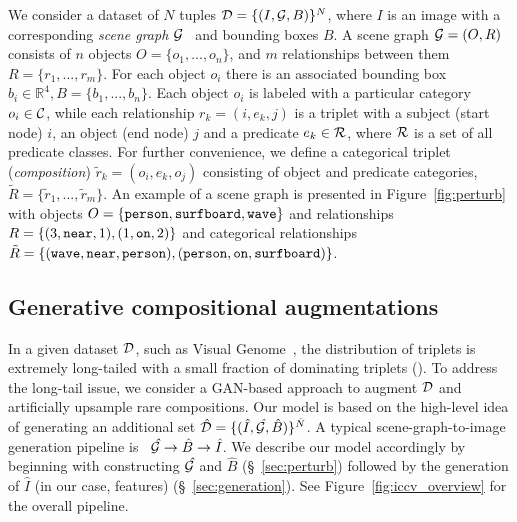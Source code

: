 We consider a dataset of $N$ tuples ${\cal D}=\{(I,\mathit{\cal G},B)\}^N$, where $I$ is an image with a corresponding \textit{scene graph} $\mathit{\cal G}$~\citep{johnson2015image} and bounding boxes $B$.
A scene graph $\mathit{\cal G}=(O, R)$ consists of $n$ objects $O= \{o_1, ... , o_n\}$, and $m$ relationships between them $R=\{r_1, ..., r_m\}$. 
For each object $o_i$ there is an associated bounding box
$b_i \in \mathbb{R}^{4}, B = \{b_1, ... , b_n\}$.
Each object $o_i$ is labeled with a particular category $o_i \in \cal{C}$, while each relationship $r_k=(i, e_k, j)$ is a triplet with a subject (start node) $i$, an object (end node) $j$ and a predicate $e_k \in {\cal R}$, where $\cal R$ is a set of all predicate classes. 
For further convenience, we define a categorical triplet (\textit{composition})  $\tilde{r}_k=(o_i, e_k, o_j)$ consisting of object and predicate categories, $\tilde{R}=\{\tilde{r}_1, ..., \tilde{r}_m\}$.
An example of a scene graph is presented in Figure~\ref{fig:perturb} with objects $O=\{\text{\texttt{person}}, \text{\texttt{surfboard}}, \text{\texttt{wave}} \}$ and relationships $R=\{ (3,\text{\texttt{near}}, 1), (1,\text{\texttt{on}},2) \}$ and categorical relationships $\tilde{R}=\{ (\text{\texttt{wave}},\text{\texttt{near}},\text{\texttt{person}}), (\text{\texttt{person}},\text{\texttt{on}},\text{\texttt{surfboard}}) \}$.

\vspace{-5pt}
\subsection{Generative compositional augmentations\label{sec:model}}
\vspace{-5pt}

In a given dataset $\cal D$, such as Visual Genome~\citep{krishna2017visual}, the distribution of triplets is extremely long-tailed with a small fraction of dominating triplets (\fig{\ref{fig:iccv_motivation}}). To address the long-tail issue, we consider a GAN-based approach to augment $\cal D$ and artificially upsample rare compositions.
Our model is based on the high-level idea of generating an additional set $\hat{\cal D} = \{ (\hat{I},\mathit{\hat{\mathit{\cal G}}}, \hat{B}) \}^{\hat{N}}$. A typical scene-graph-to-image generation pipeline is~\citep{johnson2018image} $\mathit{\hat{\mathit{\cal G}}} \rightarrow \hat{B} \rightarrow \hat{I} $. We describe our model accordingly by beginning with constructing $\mathit{\hat{\mathit{\cal G}}}$ and $\hat{B}$ (\S~\ref{sec:perturb}) followed by the generation of $\hat{I}$ (in our case, features) (\S~\ref{sec:generation}). See Figure~\ref{fig:iccv_overview} for the overall pipeline.


